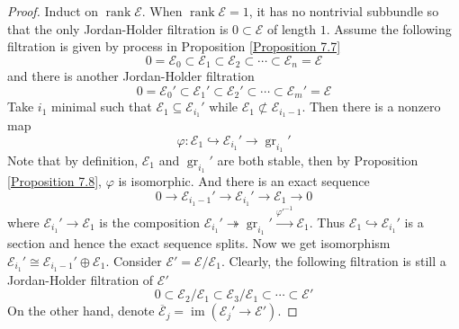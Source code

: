 \documentclass{ctexart}
\newcommand{\rank}{\operatorname{rank}}
\newcommand{\im}{\operatorname{im}}
\newcommand{\grade}{\operatorname{gr}}
\begin{document}
\begin{proof}
    Induct on $\rank \mathcal{E}$.
    When $\rank \mathcal{E} = 1$, it has no nontrivial subbundle so that the only Jordan-Holder filtration is $0 \subset \mathcal{E}$ of length $1$.
    Assume the following filtration is given by process in Proposition \ref{Proposition 7.7}
    \begin{equation}
        0 = \mathcal{E}_{0} \subset \mathcal{E}_{1} \subset \mathcal{E}_{2} \subset \cdots \subset \mathcal{E}_{n} = \mathcal{E}
    \end{equation}
    and there is another Jordan-Holder filtration
    \begin{equation}
        0 = \mathcal{E}_{0}' \subset \mathcal{E}_{1}' \subset \mathcal{E}_{2}' \subset \cdots \subset \mathcal{E}_{m}' = \mathcal{E}
    \end{equation}
    Take $i_{1}$ minimal such that $\mathcal{E}_{1} \subseteq \mathcal{E}_{i_{1}}'$ while $\mathcal{E}_{1} \not\subset \mathcal{E}_{i_{1} - 1}$.
    Then there is a nonzero map
    \begin{equation}
        \varphi: \mathcal{E}_{1} \hookrightarrow \mathcal{E}_{i_{1}}' \rightarrow \grade_{i_{1}}'
    \end{equation}
    Note that by definition, $\mathcal{E}_{1}$ and $\grade_{i_{1}}'$ are both stable,
    then by Proposition \ref{Proposition 7.8}, $\varphi$ is isomorphic.
    And there is an exact sequence
    \begin{equation}
        0 \longrightarrow \mathcal{E}_{i_{1} - 1}' \longrightarrow \mathcal{E}_{i_{1}}' \longrightarrow \mathcal{E}_{1} \longrightarrow 0
    \end{equation}
    where $\mathcal{E}_{i_{1}}' \rightarrow \mathcal{E}_{1}$ is the composition $\mathcal{E}_{i_{1}}' \twoheadrightarrow \grade_{i_{1}}' \overset{{\varphi'}^{-1}}{\rightarrow} \mathcal{E}_{1}$.
    Thus $\mathcal{E}_{1} \hookrightarrow \mathcal{E}_{i_{1}}'$ is a section and hence the exact sequence splits.
    Now we get isomorphism $\mathcal{E}_{i_{1}}' \cong \mathcal{E}_{i_{1} - 1}' \oplus \mathcal{E}_{1}$.
    Consider $\mathcal{E}' = \mathcal{E}/\mathcal{E}_{1}$.
    Clearly, the following filtration is still a Jordan-Holder filtration of $\mathcal{E}'$
    \begin{equation}
        0 \subset \mathcal{E}_{2}/\mathcal{E}_{1} \subset \mathcal{E}_{3}/\mathcal{E}_{1} \subset \cdots \subset \mathcal{E}'
    \end{equation}
    On the other hand, denote $\overline{\mathcal{E}}_{j} = \im (\mathcal{E}_{j}' \rightarrow \mathcal{E}')$.

\end{proof}
\end{document}
